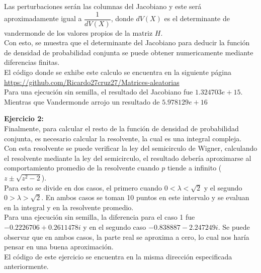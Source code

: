 \documentclass[paper=letter, fontsize=14pt]{scrartcl}
\numberwithin{equation}{section} %
\numberwithin{figure}{section} %
\numberwithin{table}{section} %
\begin{document}
Las perturbaciones serán las columnas del Jacobiano y este será aproximadamente igual a $\dfrac{1}{dV(X)}$, donde $dV(X)$ es el determinante de vandermonde de los valores propios de la matriz $H$.\\

Con esto, se muestra que el determinante del Jacobiano para deducir la función de densidad de probabilidad conjunta se puede obtener numericamente mediante diferencias finitas.\\

El código donde se exhibe este calculo se encuentra en la siguiente página \url{https://github.com/Ricardo27cruz27/Matrices-aleatorias}\\

Para una ejecución sin semilla, el resultado del Jacobiano fue $1.324703e+15$. Mientras que Vandermonde arrojo un resultado de $5.978129e+16$

\pagebreak

\textbf{Ejercicio 2:}\\

Finalmente, para calcular el resto de la función de densidad de probabilidad conjunta, es necesario calcular la resolvente, la cual es una integral compleja.\\

Con esta resolvente se puede verificar la ley del semicirculo de Wigner, calculando el resolvente mediante la ley del semicirculo, el resultado debería aproximarse al comportamiento promedio de la resolvente cuando $p$ tiende a infinito ($z\pm\sqrt{z^2-2}$).\\

Para esto se divide en dos casos, el primero cuando $0<\lambda<\sqrt{2}$ y el segundo $0>\lambda>\sqrt{2}$. En ambos casos se toman 10 puntos en este intervalo y se evaluan en la integral y en la resolvente promedio.\\

Para una ejecución sin semilla, la diferencia para el caso 1 fue $-0.2226706+0.2611478i$ y en el segundo caso $-0.838887-2.247249i$. Se puede observar que en ambos casos, la parte real se aproxima a cero, lo cual nos haría pensar en una buena aproximación.\\

El código de este ejercicio se encuentra en la misma dirección especificada anteriormente.
\end{document}
